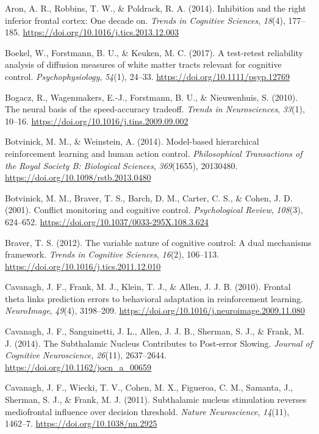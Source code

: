 \documentclass[12pt,openany]{book}
\theoremstyle{definition}
\theoremstyle{definition}
\theoremstyle{definition}
\theoremstyle{remark}
\begin{document}
\hypertarget{ref-Aron2014b}{}
Aron, A. R., Robbins, T. W., \& Poldrack, R. A. (2014). Inhibition and
the right inferior frontal cortex: One decade on. \emph{Trends in
Cognitive Sciences}, \emph{18}(4), 177--185.
\url{https://doi.org/10.1016/j.tics.2013.12.003}

\hypertarget{ref-Boekel2017}{}
Boekel, W., Forstmann, B. U., \& Keuken, M. C. (2017). A test-retest
reliability analysis of diffusion measures of white matter tracts
relevant for cognitive control. \emph{Psychophysiology}, \emph{54}(1),
24--33. \url{https://doi.org/10.1111/psyp.12769}

\hypertarget{ref-Bogacz2010}{}
Bogacz, R., Wagenmakers, E.-J., Forstmann, B. U., \& Nieuwenhuis, S.
(2010). The neural basis of the speed-accuracy tradeoff. \emph{Trends in
Neurosciences}, \emph{33}(1), 10--16.
\url{https://doi.org/10.1016/j.tins.2009.09.002}

\hypertarget{ref-Botvinick2014}{}
Botvinick, M. M., \& Weinstein, A. (2014). Model-based hierarchical
reinforcement learning and human action control. \emph{Philosophical
Transactions of the Royal Society B: Biological Sciences},
\emph{369}(1655), 20130480. \url{https://doi.org/10.1098/rstb.2013.0480}

\hypertarget{ref-Botvinick2001}{}
Botvinick, M. M., Braver, T. S., Barch, D. M., Carter, C. S., \& Cohen,
J. D. (2001). Conflict monitoring and cognitive control.
\emph{Psychological Review}, \emph{108}(3), 624--652.
\url{https://doi.org/10.1037/0033-295X.108.3.624}

\hypertarget{ref-Braver2012}{}
Braver, T. S. (2012). The variable nature of cognitive control: A dual
mechanisms framework. \emph{Trends in Cognitive Sciences}, \emph{16}(2),
106--113. \url{https://doi.org/10.1016/j.tics.2011.12.010}

\hypertarget{ref-Cavanagh2010a}{}
Cavanagh, J. F., Frank, M. J., Klein, T. J., \& Allen, J. J. B. (2010).
Frontal theta links prediction errors to behavioral adaptation in
reinforcement learning. \emph{NeuroImage}, \emph{49}(4), 3198--209.
\url{https://doi.org/10.1016/j.neuroimage.2009.11.080}

\hypertarget{ref-Cavanagh2014a}{}
Cavanagh, J. F., Sanguinetti, J. L., Allen, J. J. B., Sherman, S. J., \&
Frank, M. J. (2014). The Subthalamic Nucleus Contributes to Post-error
Slowing. \emph{Journal of Cognitive Neuroscience}, \emph{26}(11),
2637--2644. \url{https://doi.org/10.1162/jocn_a_00659}

\hypertarget{ref-Cavanagh2011b}{}
Cavanagh, J. F., Wiecki, T. V., Cohen, M. X., Figueroa, C. M., Samanta,
J., Sherman, S. J., \& Frank, M. J. (2011). Subthalamic nucleus
stimulation reverses mediofrontal influence over decision threshold.
\emph{Nature Neuroscience}, \emph{14}(11), 1462--7.
\url{https://doi.org/10.1038/nn.2925}
\end{document}
